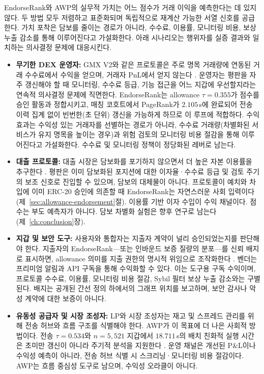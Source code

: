 
EndorseRank와 AWP의 실무적 가치는 어느 점수가 거래 이익을 예측한다는 데 있지 않다. 두 방법 모두 저렴하고 표준화되며 독립적으로 재계산 가능한 서열 신호를 공급한다. 가치 포착은 담보를 줄이는 경로가 아니라, 수수료, 이용률, 모니터링 비용, 보상 누출 감소를 통해 이루어진다고 가설화한다. 아래 시나리오는 행위자를 실증 결과와 일치하는 의사결정 문제에 대응시킨다.

\begin{itemize}
\item \textbf{무기한 DEX 운영자:} GMX V2와 같은 프로토콜은 주로 명목 거래량에 연동된 거래 수수료에서 수익을 얻으며, 거래자 PnL에서 얻지 않는다 . 운영자는 평판을 자주 갱신해야 할 때 모니터링, 수수료 등급, 기능 접근을 어느 지갑에 우선할지라는 연속적 의사결정 문제에 직면한다. EndorseRank는 allowance $\tau=0.355$가 점수를 승인 활동과 정합시키고, 매칭 코호트에서 PageRank가 $2.105$\,s에 완료되어 전송 이력 집계 없이 빈번한(초 단위) 갱신을 가능하게 하므로 이 루프에 적합하다. 수익 효과는 수익성 있는 거래자를 선별하는 경로가 아니라, 수수료 거래량(차별화된 서비스가 유지 명목을 높이는 경우)과 위험 검토의 모니터링 비용 절감을 통해 이루어진다고 가설화한다. 수수료 및 모니터링 정책이 정당화된 레버로 남는다.

\item \textbf{대출 프로토콜:} 대출 시장은 담보화를 포기하지 않으면서 더 높은 자본 이용률을 추구한다 . 평판은 이미 담보화된 포지션에 대한 이자율·수수료 등급 및 검토 주기의 보조 신호로 진입할 수 있으며, 담보의 대체물이 아니다. 프로토콜이 예치와 차입에 이미 ERC-20 승인에 의존할 때 EndorseRank는 자연스러운 사회 입력이다(제~\ref{sec:allowance-endorsement}절). 이용률 기반 이자 수입이 수익 채널이다. 점수는 부도 예측자가 아니다. 담보 차별화 실험은 향후 연구로 남는다(제~\ref{ch:conclusion}장).

\item \textbf{지갑 및 보안 도구:} 사용자와 통합자는 지출자 계약이 널리 승인되었는지를 판단해야 한다. 지출자의 EndorseRank---또는 인바운드 보증 질량의 분포---를 신뢰 배지로 표시하면, allowance 의미를 지출 권한의 명시적 위임으로 조작화한다 . 벤더는 프리미엄 알림과 API 구독을 통해 수익화할 수 있다. 이는 도구용 구독 수익이며, 프로토콜 수수료, 이용률, 모니터링 비용 절감, Sybil 필터 보상 누출 감소와는 구별된다. 배지는 공개된 간선 정의 하에서의 그래프 위치를 보고하며, 보안 감사나 악성 계약에 대한 보증이 아니다.

\item \textbf{유동성 공급자 및 시장 조성자:} LP와 시장 조성자는 재고 및 스프레드 관리를 위해 전송 허브와 흐름 구조를 식별해야 한다. AWP가 이 목표에 더 나은 사회적 방법이다. 전송 $\tau=0.534$와 $n=5{,}521$ 지갑에서 $18.711$\,s의 배치 친화적 실행 시간은 초미만 갱신이 아니라 주기적 분석을 지원한다 . 운영 채널은 개선된 P\&L이나 수익성 예측이 아니라, 전송 허브 식별 시 스크리닝·모니터링 비용 절감이다. AWP는 흐름 중심성 도구로 남으며, 수익성 오라클이 아니다.


\end{itemize}
